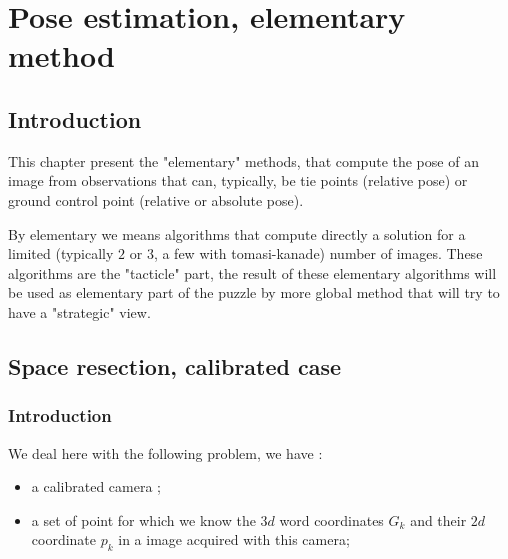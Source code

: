 \chapter{Pose estimation, elementary method}


\section{Introduction}

This chapter present the "elementary" methods, that compute the pose of an image
from observations that can, typically, be tie points (relative pose) or 
ground control point (relative or absolute pose).

By elementary we means algorithms that compute directly a solution for a limited
(typically $2$ or $3$, a few with tomasi-kanade) number of images. These algorithms
are the "tacticle" part, the result of these elementary algorithms will be used as
elementary part of the puzzle by more global method that will try to have a "strategic"  view.



\section{Space resection, calibrated case}

\label{SR_Cal}

\subsection{Introduction}

We deal here with the following problem,  we have :

\begin{itemize}
   \item a calibrated camera ;
   \item a set of point for which we know the  $3d$ word coordinates $G_k$ and their 
        $2d$ coordinate $p_k$ in a image acquired with this camera;
\end{itemize}


